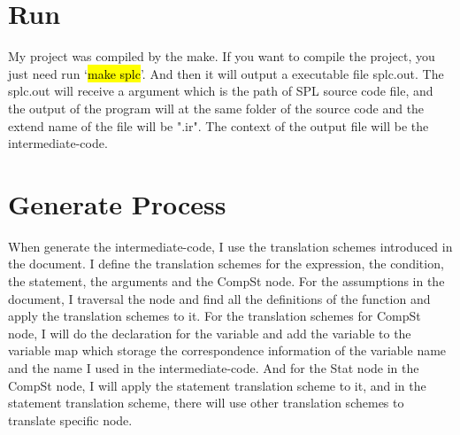 \documentclass{article}
\begin{document}
    \section{Run}
        My project was compiled by the make. If you want to compile the project, you just need run `\hl{make splc}'. 
        And then it will output a executable file splc.out. The splc.out will receive a argument which is the path of 
        SPL source code file, and the output of the program will at the same folder of the source code and the extend name of the file 
        will be ".ir". The context of the output file will be the intermediate-code.
    \section{Generate Process}
        When generate the intermediate-code, I use the translation schemes introduced in the document. I define the translation schemes for the expression, the condition, the
        statement, the arguments and the CompSt node. For the assumptions in the document, I traversal the node and find all the definitions of the function and apply the
        translation schemes to it.
        For the translation schemes for CompSt node, I will do the declaration for the variable and add the variable to the variable map which storage the correspondence
        information of the variable name and the name I used in the intermediate-code. And for the Stat node in the CompSt node, I will apply the statement translation scheme
        to it, and in the statement translation scheme, there will use other translation schemes to translate specific node.
\end{document}
